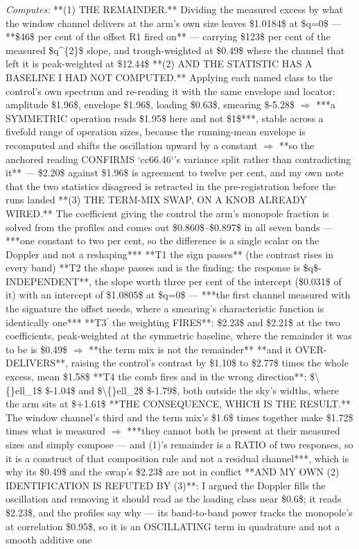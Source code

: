 \begin{description}
\emph{Computes:} **(1) THE REMAINDER.** Dividing the measured excess by what the window channel delivers at the arm's own size leaves \$1.0184\$ at \$q=0\$ --- **\$46\$ per cent of the offset R1 fired on** --- carrying \$123\$ per cent of the measured \$q\textasciicircum{}\{2\}\$ slope, and trough-weighted at \$0.49\$ where the channel that left it is peak-weighted at \$12.44\$  **(2) AND THE STATISTIC HAS A BASELINE I HAD NOT COMPUTED.** Applying each named class to the control's own spectrum and re-reading it with the same envelope and locator: amplitude \$1.96\$, envelope \$1.96\$, loading \$0.63\$, smearing \$-5.28\$ \ensuremath{\Rightarrow} ***a SYMMETRIC operation reads \$1.95\$ here and not \$1\$***, stable across a fivefold range of operation sizes, because the running-mean envelope is recomputed and shifts the oscillation upward by a constant \ensuremath{\Rightarrow}  **so the anchored reading CONFIRMS `cc66.46`'s variance split rather than contradicting it** --- \$2.20\$ against \$1.96\$ is agreement to twelve per cent, and my own note that the two statistics disagreed is retracted in the pre-registration before the runs landed  **(3) THE TERM-MIX SWAP, ON A KNOB ALREADY WIRED.** The coefficient giving the control the arm's monopole fraction is solved from the profiles and comes out \$0.860\$--\$0.897\$ in all seven bands --- ***one constant to two per cent, so the difference is a single scalar on the Doppler and not a reshaping***   **T1 the sign passes** (the contrast rises in every band)   **T2 the shape passes and is the finding: the response is \$q\$-INDEPENDENT**, the slope worth three per cent of the intercept (\$0.031\$ of it) with an intercept of \$1.0805\$ at \$q=0\$ --- ***the first channel measured with the signature the offset needs, where a smearing's characteristic function is identically one***   **T3\ensuremath{{}^\prime} the weighting FIRES**: \$2.23\$ and \$2.21\$ at the two coefficients, peak-weighted at the symmetric baseline, where the remainder it was to be is \$0.49\$ \ensuremath{\Rightarrow} **the term mix is not the remainder**   **and it OVER-DELIVERS**, raising the control's contrast by \$1.10\$ to \$2.77\$ times the whole excess, mean \$1.58\$   **T4 the comb fires and in the wrong direction**: \$\textbackslash\{\}ell\_1\$ \$-1.04\$ and \$\textbackslash\{\}ell\_2\$ \$-1.79\$, both outside the sky's widths, where the arm sits at \$+1.61\$   **THE CONSEQUENCE, WHICH IS THE RESULT.** The window channel's third and the term mix's \$1.6\$ times together make \$1.72\$ times what is measured \ensuremath{\Rightarrow} ***they cannot both be present at their measured sizes and simply compose --- and (1)'s remainder is a RATIO of two responses, so it is a construct of that composition rule and not a residual channel***, which is why its \$0.49\$ and the swap's \$2.23\$ are not in conflict   **AND MY OWN (2) IDENTIFICATION IS REFUTED BY (3)**: I argued the Doppler fills the oscillation and removing it should read as the loading class near \$0.6\$; it reads \$2.23\$, and the profiles say why --- its band-to-band power tracks the monopole's at correlation \$0.95\$, so it is an OSCILLATING term in quadrature and not a smooth additive one

\end{description}
